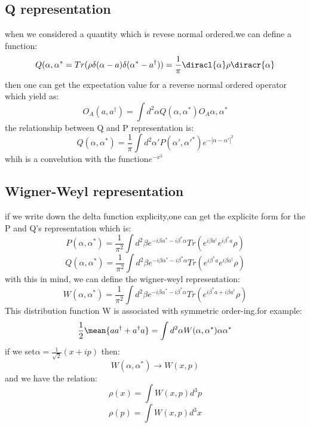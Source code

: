 \subsection{Q representation}
when we considered a quantity which is revese normal ordered.we can define a function:
\begin{equation}
Q(\alpha,\alpha^*=Tr(\rho\delta(\alpha-a)\delta(\alpha^*-a^\dagger))=\frac{1}{\pi}\diracl{\alpha}\rho\diracr{\alpha}
\end{equation}
then one can get the expectation value for a reverse normal ordered operator which yield as:
\[O_{A}(a,a^{\dagger})=\int d^2\alpha Q(\alpha,\alpha^*)O_A{\alpha,\alpha^*}\]
the relationship between Q and P representation is:
\[Q(\alpha,\alpha^*)=\frac{1}{\pi}\int d^2\alpha' P(\alpha',\alpha'^{*})e^{-|\alpha-\alpha'|^2}\]
whih is a convelution with the function$e^{-x^2}$
\subsection{Wigner-Weyl representation}
if we write down the delta function explicity,one can get the explicite form for the P and Q's representation which is:
\[P(\alpha,\alpha^*)=\frac{1}{\pi^2}\int d^2\beta e^{-i\beta \alpha^*-i\beta^*\alpha}Tr(e^{i\beta a^\dagger}e^{i\beta^* a}\rho)\]
\[Q(\alpha,\alpha^*)=\frac{1}{\pi^2}\int d^2\beta e^{-i\beta \alpha^*-i\beta^*\alpha}Tr( e^{i\beta^* a}e^{i\beta a^\dagger}\rho)\]
with this in mind, we can define the wigner-weyl representation:
\[W(\alpha,\alpha^*)=\frac{1}{\pi^2}\int d^2\beta e^{-i\beta \alpha^*-i\beta^*\alpha}Tr(e^{i\beta^* a+i\beta a^\dagger}\rho)\]
This distribution function W is associated with symmetric order-ing.for example:
\[\frac{1}{2}\mean{aa^\dagger+a^\dagger a}=\int d^2\alpha W(\alpha,\alpha^*)\alpha\alpha^*\]
if we set$\alpha=\frac{1}{\sqrt{2}}(x+ip)$ then:
\[W(\alpha,\alpha^*)\rightarrow W(x,p)\]
and we have the relation:
\[\rho(x)=\int W(x,p)d^3p\]
\[\rho(p)=\int W(x,p)d^3x\]
